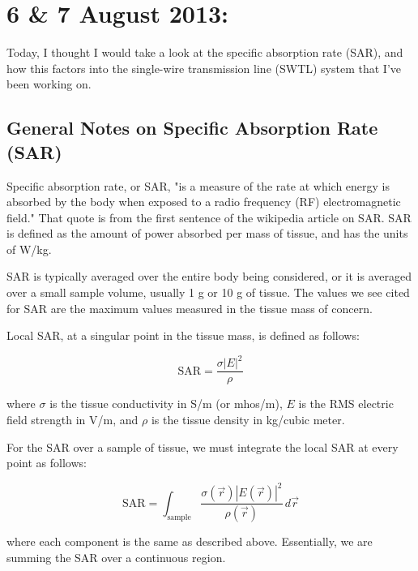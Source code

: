 \documentclass[12pt,onecolumn,titlepage]{article}
\begin{document}
\clearpage
\section{6 \& 7 August 2013:}

\indent \indent Today, I thought I would take a look at the specific absorption rate (SAR), and how this factors into the single-wire transmission line (SWTL) system that I've been working on.

\subsection{General Notes on Specific Absorption Rate (SAR)}
\indent \indent Specific absorption rate, or SAR, "is a measure of the rate at which energy is absorbed by the body when exposed to a radio frequency (RF) electromagnetic field." That quote is from the first sentence of the wikipedia article on SAR. SAR is defined as the amount of power absorbed per mass of tissue, and has the units of W/kg. 

SAR is typically averaged over the entire body being considered, or it is averaged over a small sample volume, usually 1 g or 10 g of tissue. The values we see cited for SAR are the maximum values measured in the tissue mass of concern. 

Local SAR, at a singular point in the tissue mass, is defined as follows:

\begin{equation}
\label{equ:local_SAR}
\text{SAR} = \frac{\sigma \left| E \right|^2}{\rho}
\end{equation}

where $\sigma$ is the tissue conductivity in S/m (or mhos/m), $E$ is the RMS electric field strength in V/m, and $\rho$ is the tissue density in kg/cubic meter.

For the SAR over a sample of tissue, we must integrate the local SAR at every point as follows:

\begin{equation}
\text{SAR} = \int_{\text{sample}} \frac{\sigma \left( \vec{r} \right) \left| E \left( \vec{r} \right) \right|^2}{\rho \left( \vec{r} \right)} \, d \vec{r}
\end{equation}

where each component is the same as described above. Essentially, we are summing the SAR over a continuous region. 
\end{document}

